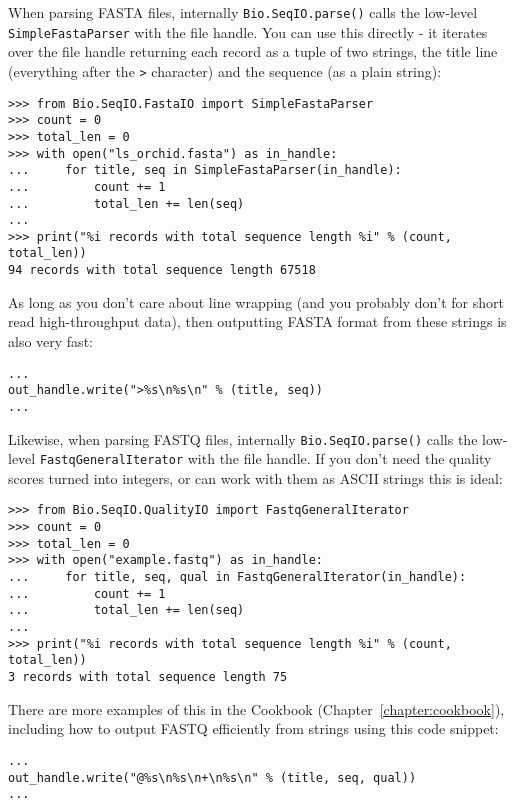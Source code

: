 When parsing FASTA files, internally \verb|Bio.SeqIO.parse()| calls
the low-level \verb|SimpleFastaParser| with the file handle.
You can use this directly - it iterates over the file handle returning
each record as a tuple of two strings, the title line (everything after
the \verb|>| character) and the sequence (as a plain string):

\begin{verbatim}
>>> from Bio.SeqIO.FastaIO import SimpleFastaParser
>>> count = 0
>>> total_len = 0
>>> with open("ls_orchid.fasta") as in_handle:
...     for title, seq in SimpleFastaParser(in_handle):
...         count += 1
...         total_len += len(seq)
...
>>> print("%i records with total sequence length %i" % (count, total_len))
94 records with total sequence length 67518
\end{verbatim}

As long as you don't care about line wrapping (and you probably don't
for short read high-throughput data), then outputting FASTA format from
these strings is also very fast:

\begin{verbatim}
...
out_handle.write(">%s\n%s\n" % (title, seq))
...
\end{verbatim}

Likewise, when parsing FASTQ files, internally \verb|Bio.SeqIO.parse()|
calls the low-level \verb|FastqGeneralIterator| with the file handle.
If you don't need the quality scores turned into integers,
or can work with them as ASCII strings this is ideal:

\begin{verbatim}
>>> from Bio.SeqIO.QualityIO import FastqGeneralIterator
>>> count = 0
>>> total_len = 0
>>> with open("example.fastq") as in_handle:
...     for title, seq, qual in FastqGeneralIterator(in_handle):
...         count += 1
...         total_len += len(seq)
...
>>> print("%i records with total sequence length %i" % (count, total_len))
3 records with total sequence length 75
\end{verbatim}

There are more examples of this in the Cookbook (Chapter~\ref{chapter:cookbook}),
including how to output FASTQ efficiently from strings using this code snippet:

\begin{verbatim}
...
out_handle.write("@%s\n%s\n+\n%s\n" % (title, seq, qual))
...
\end{verbatim}
